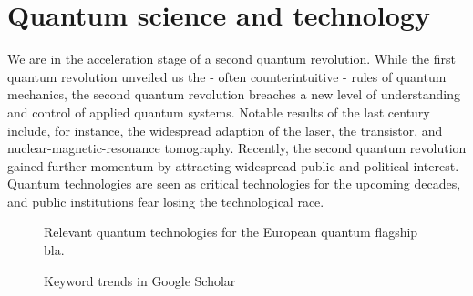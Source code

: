 \section{Quantum science and technology}

We are in the acceleration stage of a second quantum revolution.
While the first quantum revolution unveiled us the - often counterintuitive - rules of quantum mechanics, the second quantum revolution breaches a new level of understanding and control of applied quantum systems.
Notable results of the last century include, for instance, the widespread adaption of the laser, the transistor, and nuclear-magnetic-resonance tomography.
Recently, the second quantum revolution gained further momentum by attracting widespread public and political interest.
Quantum technologies are seen as critical technologies for the upcoming decades, and public institutions fear losing the technological race.


\begin{figure}[htb]
	\centering
	
	\caption{Relevant quantum technologies for the European quantum flagship bla.}
\end{figure}

\begin{figure}[htb]
	\centering
	
	\caption{Keyword trends in Google Scholar}
\end{figure}


